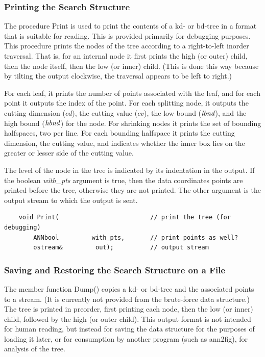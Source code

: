 \documentclass[11pt]{article}		%
\newcommand{\annfig}[0]{\textsf{ann2fig}}
\begin{document}
\subsubsection{Printing the Search Structure}\label{print.sec}

The procedure Print is used to print the contents of a kd- or bd-tree
in a format that is suitable for reading.  This is provided primarily
for debugging purposes. This procedure prints the nodes of the
tree according to a right-to-left inorder traversal.  That is, for
an internal node it first prints the high (or outer) child, then the
node itself, then the low (or inner) child.  (This is done this way
because by tilting the output clockwise, the traversal appears to be
left to right.)

For each leaf, it prints the number of points associated with the leaf,
and for each point it outputs the index of the point.  For each splitting
node, it outputs the cutting dimension ($cd$), the cutting value ($cv$),
the low bound ($\it lbnd$), and the high bound ($\it hbnd$) for the node.
For shrinking nodes it prints the set of bounding halfspaces, two per
line.  For each bounding halfspace it prints the cutting dimension,
the cutting value, and indicates whether the inner box lies on the greater
or lesser side of the cutting value.

The level of the node in the tree is indicated by its indentation in the
output.  If the boolean \textit{with\_pts} argument is true, then the data
coordinates points are printed before the tree, otherwise they are not
printed.  The other argument is the output stream to which the output is
sent.

{\small \begin{verbatim}
    void Print(                         // print the tree (for debugging)
        ANNbool         with_pts,       // print points as well?
        ostream&         out);          // output stream
\end{verbatim} }

\subsubsection{Saving and Restoring the Search Structure on a File}\label{dump.sec}

The member function \textsf{Dump()} copies a kd- or bd-tree and the associated
points to a stream.  (It is currently not provided from the brute-force
data structure.) The tree is printed in preorder, first printing each node,
then the low (or inner) child, followed by the high (or outer child).  This
output format is not intended for human reading, but instead for saving the
data structure for the purposes of loading it later, or for consumption
by another program (such as {\annfig}), for analysis of the tree.
\end{document}
